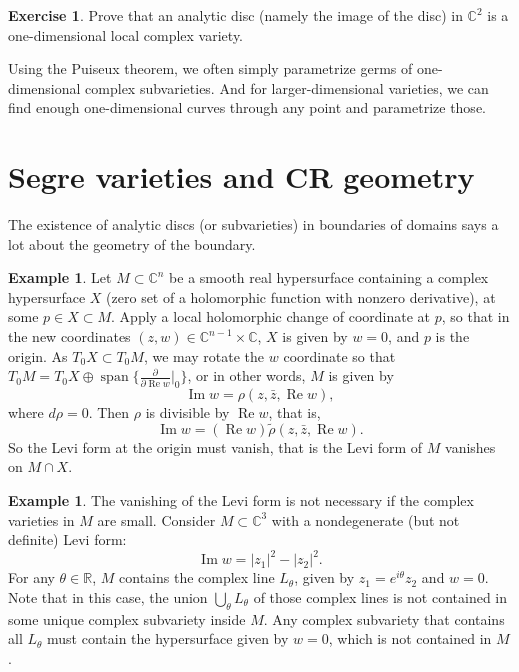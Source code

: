 \documentclass[12pt,openany]{book}
\renewcommand{\Re}{\operatorname{Re}}
\renewcommand{\Im}{\operatorname{Im}}
\newcommand{\abs}[1]{\left\lvert {#1} \right\rvert}
\newcommand{\C}{{\mathbb{C}}}
\newcommand{\R}{{\mathbb{R}}}
\newcommand{\sectionnewpage}{}
\theoremstyle{plain}
\theoremstyle{remark}
\theoremstyle{definition}
\newenvironment{exbox}{%
    \def\FrameCommand{\vrule width 1pt \relax\hspace {10pt}}%
    \MakeFramed {\advance \hsize -\width \FrameRestore }%
}{%
    \endMakeFramed
}
\theoremstyle{exercise}
\newtheorem{exercise}{Exercise}[section]
\theoremstyle{example}
\newtheorem{example}[thm]{Example}
\begin{document}
\begin{exbox}
\begin{exercise}
Prove that an analytic disc (namely the image of the disc) in $\C^2$
is a one-dimensional local complex variety.
\end{exercise}
\end{exbox}

Using the Puiseux theorem, we often simply parametrize germs
of one-dimensional complex subvarieties.  
And for larger-dimensional varieties, we can find
enough one-dimensional curves through any point and parametrize those.


\sectionnewpage
\section{Segre varieties and CR geometry} \label{sec:crgeomcr}

The existence of analytic discs (or subvarieties)
in boundaries of domains says a lot about the geometry of the boundary.

\begin{example}
Let $M \subset \C^n$ be a smooth real hypersurface containing
a complex hypersurface $X$ (zero set of a holomorphic function
with nonzero derivative), at some $p \in X \subset M$.
Apply a local holomorphic change of coordinate at $p$, so
that in the new coordinates
$(z,w) \in \C^{n-1} \times \C$,
$X$ is given by $w=0$, and $p$ is the origin.
As $T_0 X \subset T_0 M$, we may rotate the $w$ coordinate
so that $T_0 M = T_0 X \oplus \operatorname{span} \bigl\{
\frac{\partial}{\partial \Re w}\big|_0 \bigr\}$,
or in other words, $M$ is given by
\begin{equation*}
\Im w = \rho(z,\bar{z},\Re w) ,
\end{equation*}
where $d\rho = 0$.
Then $\rho$
is divisible by $\Re w$, that is,
\begin{equation*}
\Im w = (\Re w) \widetilde{\rho}(z,\bar{z},\Re w)  .
\end{equation*}
So the Levi form at the origin must vanish,
that is the Levi form of $M$ vanishes on $M \cap X$.
\end{example}

\begin{example}
The vanishing of the Levi form is not necessary if the complex varieties in
$M$ are small.  Consider $M\subset \C^3$ with a nondegenerate (but not definite)
Levi form:
\begin{equation*}
\Im w = \abs{z_1}^2-\abs{z_2}^2 .
\end{equation*}
For any $\theta \in \R$,
$M$ contains the complex line $L_\theta$,
given by $z_1 = e^{i\theta} z_2$ and
$w = 0$.  Note that in this case, the union $\bigcup_\theta L_\theta$ of those
complex lines is not
contained in some unique complex subvariety inside $M$.  Any complex
subvariety that contains all $L_\theta$ must contain the hypersurface given
by $w = 0$, which is not contained in $M$.
\end{example}
\end{document}
